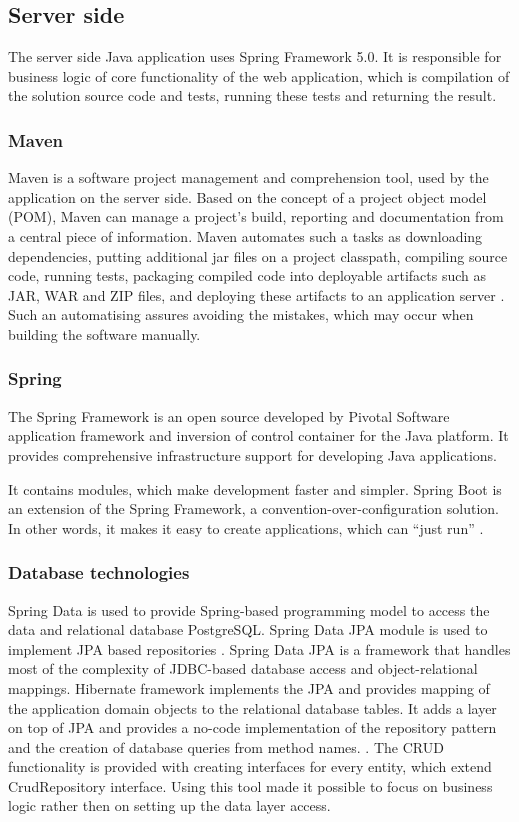 \subsection{Server side}
The server side Java application uses Spring Framework 5.0. It is responsible for business logic of core functionality of the web application, which is compilation of the solution source code and tests, running these tests and returning the result.

\subsubsection{Maven}
Maven is a software project management and comprehension tool, used by the application on the server side. Based on the concept of a project object model (POM), Maven can manage a project's build, reporting and documentation from a central piece of information. Maven automates such a tasks as downloading dependencies, putting additional jar files on a project classpath, compiling source code, running tests, packaging compiled code into deployable artifacts such as JAR, WAR and ZIP files, and deploying these artifacts to an application server \cite{maven}. Such an automatising assures avoiding the mistakes, which may occur when building the software manually.

\subsubsection{Spring}
The Spring Framework is an open source developed by Pivotal Software application framework and inversion of control container for the Java platform. It provides comprehensive infrastructure support for developing Java applications. 

It contains modules, which make development faster and simpler. Spring Boot is an extension of the Spring Framework, a convention-over-configuration solution. In other words, it makes it easy to create applications, which can ``just run'' \cite{spring_boot}.

\subsubsection{Database technologies}
Spring Data is used to provide Spring-based programming model to access the data and relational database PostgreSQL. Spring Data JPA module is used to implement JPA based repositories \cite{spring_data}. Spring Data JPA is a framework that handles most of the complexity of JDBC-based database access and object-relational mappings. Hibernate framework implements the JPA and provides mapping of the application domain objects to the relational database tables. It adds a layer on top of JPA and provides a no-code implementation of the repository pattern and the creation of database queries from method names. \cite[Part VI, Persistence]{jpa}. The CRUD functionality is provided with creating interfaces for every entity, which extend CrudRepository interface. Using this tool made it possible to focus on business logic rather then on setting up the data layer access.

